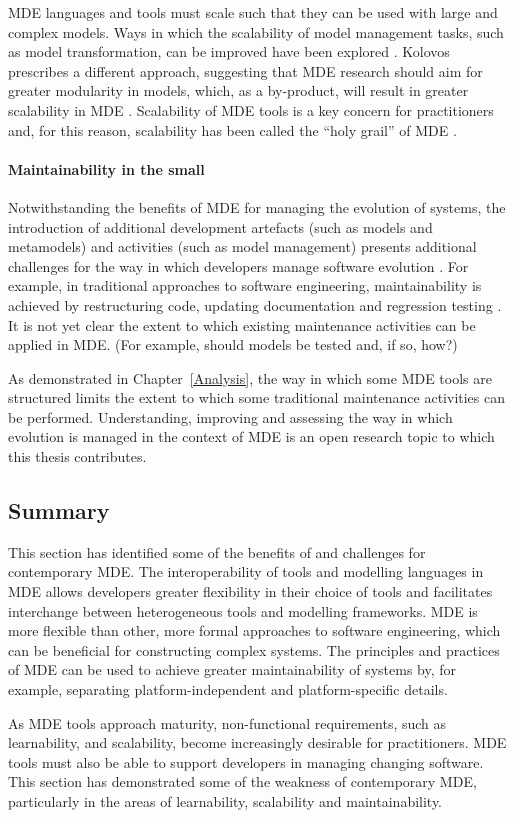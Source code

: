 MDE languages and tools must scale such that they can be used with large and complex models. Ways \cc in which the scalability of model management tasks, such as model transformation, can be improved have been explored \cite{hearnden06incremental,rath08live,tratt08change}. Kolovos \cc prescribes a different approach, suggesting that MDE research should aim for greater modularity in models, which, as a by-product, will result in greater scalability in MDE \cite{kolovos08scalability}. Scalability of MDE tools is a key concern for practitioners and, for this reason, scalability has been called the ``holy grail'' of MDE \cite{kolovos08scalability}.

\paragraph{Maintainability in the small} Notwithstanding the benefits of MDE for managing the evolution of systems, the introduction of additional development artefacts (such as models and metamodels) and activities (such as model management) presents additional challenges for the way in which developers manage software evolution \cite{Mens07}. For example, in traditional approaches to software engineering, maintainability is achieved by restructuring code, updating documentation and regression testing \cite{feathers04working}. It is not yet clear the extent to which existing maintenance activities can be applied in MDE. (For example, should models be tested and, if so, how?)

As demonstrated in Chapter~\ref{Analysis}, the way in which some MDE tools are structured limits the extent to which some traditional maintenance activities can be performed. Understanding, improving and assessing the way in which evolution is managed in the context of MDE is an open research topic to which this thesis contributes. 

\subsection{Summary}
This section has identified some of the benefits of and challenges for contemporary MDE. The interoperability of tools and modelling languages in MDE allows developers greater flexibility in their choice of tools and facilitates interchange between heterogeneous tools and modelling frameworks. MDE is more flexible than other, more formal approaches to software engineering, which can be beneficial for constructing complex systems. The principles and practices of MDE can be used to achieve greater maintainability of systems by, for example, separating platform-independent and platform-specific details.

As MDE tools approach maturity, non-functional requirements, such as learnability, and scalability, become increasingly desirable for practitioners. MDE tools must also be able to support developers in managing changing software. This section has demonstrated some of the weakness of contemporary MDE, particularly in the areas of learnability, scalability and maintainability.